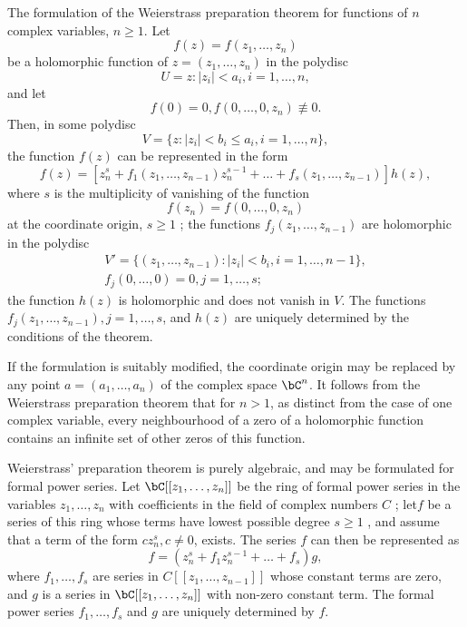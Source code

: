 \documentclass[lang=cn,12pt,fontset=none,a4paper]{beautybook}
\begin{document}
The formulation of the Weierstrass preparation theorem for functions of $n$ complex variables, $n\geq 1$. Let
$$
   f(z)=f(z_1,\dots,z_n)
$$
be a holomorphic function of $z=(z_1,\dots,z_n)$ in the polydisc
$$
   U={z:|z_i|<a_i,i=1,\dots,n},
$$
and let
$$
   f(0)=0,  f(0,\dots,0,z_n)\not\equiv 0.
$$
Then, in some polydisc
$$
   V=\{z:|z_i|<b_i\leq a_i, i=1,\dots,n\},
$$
the function $f(z)$ can be represented in the form
$$
   f(z)= [z^s_n+f_1(z_1,\dots,z_{n-1})z^{s-1}_n+\dots
   +f_s(z_1,\dots,z_{n-1})]h(z),
$$
where $s$ is the multiplicity of vanishing of the function
$$
   f(z_n)=f(0,\dots,0,z_n)
$$
at the coordinate origin, $s\geq 1$ ; the functions $f_j(z_1,\dots,z_{n-1})$ are holomorphic in the polydisc
$$
   \begin{gathered}
      V'=\{(z_1,\dots,z_{n-1}):|z_i|<b_i,i=1,\dots,n-1\},\\
      f_j(0,\dots,0)=0, j=1,\dots,s;
   \end{gathered}
$$
the function $h(z)$ is holomorphic and does not vanish in $V$. The functions $f_j(z_1,\dots,z_{n-1}), j=1,\dots,s$, and $h(z)$ are uniquely determined by the conditions of the theorem.

If the formulation is suitably modified, the coordinate origin may be replaced by any point $a=(a_1,\dots,a_n)$ of the complex space $\bC^n$. It follows from the Weierstrass preparation theorem that for $n>1$, as distinct from the case of one complex variable, every neighbourhood of a zero of a holomorphic function contains an infinite set of other zeros of this function.

Weierstrass' preparation theorem is purely algebraic, and may be formulated for formal power series. Let $\bC[[z_1,\dots,z_n]]$ be the ring of formal power series in the variables $z_1,\dots,z_n$ with coefficients in the field of complex numbers $C$
; let$ f$ be a series of this ring whose terms have lowest possible degree $s\geq 1$
, and assume that a term of the form $c z^s_n, c≠0$, exists. The series $f$ can then be represented as
$$
   f=(z^s_n+f_1 z^{s-1}_n+\dots+f_s)g,
$$
where $f_1,\dots,f_s$ are series in $C[[z_1,\dots,z_{n-1}]]$ whose constant terms are zero, and $g$ is a series in $\bC[[z_1,\dots,z_n]]$ with non-zero constant term. The formal power series $f_1,\dots,f_s$ and $g$ are uniquely determined by $f$.
\end{document}
